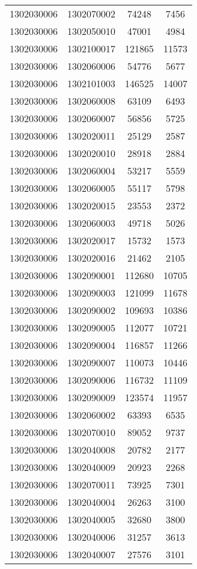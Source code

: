 \begin{longtable}[h]{llcc}
		1302030006 & 1302070002 & 74248 & 7456\\
		1302030006 & 1302050010 & 47001 & 4984\\
		1302030006 & 1302100017 & 121865 & 11573\\
		1302030006 & 1302060006 & 54776 & 5677\\
		1302030006 & 1302101003 & 146525 & 14007\\
		1302030006 & 1302060008 & 63109 & 6493\\
		1302030006 & 1302060007 & 56856 & 5725\\
		1302030006 & 1302020011 & 25129 & 2587\\
		1302030006 & 1302020010 & 28918 & 2884\\
		1302030006 & 1302060004 & 53217 & 5559\\
		1302030006 & 1302060005 & 55117 & 5798\\
		1302030006 & 1302020015 & 23553 & 2372\\
		1302030006 & 1302060003 & 49718 & 5026\\
		1302030006 & 1302020017 & 15732 & 1573\\
		1302030006 & 1302020016 & 21462 & 2105\\
		1302030006 & 1302090001 & 112680 & 10705\\
		1302030006 & 1302090003 & 121099 & 11678\\
		1302030006 & 1302090002 & 109693 & 10386\\
		1302030006 & 1302090005 & 112077 & 10721\\
		1302030006 & 1302090004 & 116857 & 11266\\
		1302030006 & 1302090007 & 110073 & 10446\\
		1302030006 & 1302090006 & 116732 & 11109\\
		1302030006 & 1302090009 & 123574 & 11957\\
		1302030006 & 1302060002 & 63393 & 6535\\
		1302030006 & 1302070010 & 89052 & 9737\\
		1302030006 & 1302040008 & 20782 & 2177\\
		1302030006 & 1302040009 & 20923 & 2268\\
		1302030006 & 1302070011 & 73925 & 7301\\
		1302030006 & 1302040004 & 26263 & 3100\\
		1302030006 & 1302040005 & 32680 & 3800\\
		1302030006 & 1302040006 & 31257 & 3613\\
		1302030006 & 1302040007 & 27576 & 3101\\

\end{longtable}
